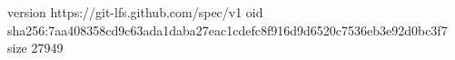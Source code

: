 version https://git-lfs.github.com/spec/v1
oid sha256:7aa408358cd9c63ada1daba27eac1cdefc8f916d9d6520c7536eb3e92d0bc3f7
size 27949
